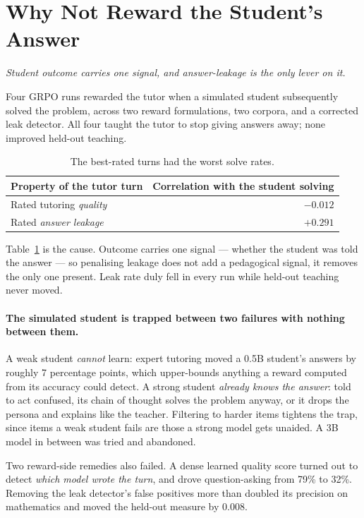 \documentclass[11pt]{article}
\newcommand{\claim}[1]{\vspace{-7pt}\par{\small\itshape #1}\par\vspace{3pt}}
\begin{document}
\section{Why Not Reward the Student's Answer}
\label{sec:why}
\claim{Student outcome carries one signal, and answer-leakage is the only lever on it.}

Four GRPO runs rewarded the tutor when a simulated student subsequently solved the problem, across two
reward formulations, two corpora, and a corrected leak detector. All four taught the tutor to stop
giving answers away; none improved held-out teaching.

\begin{table}[h]
\centering
\begin{tabular}{lr}
\toprule
\textbf{Property of the tutor turn} & \textbf{Correlation with the student solving} \\
\midrule
Rated tutoring \emph{quality} & $-0.012$ \\
Rated \emph{answer leakage}   & $+0.291$ \\
\bottomrule
\end{tabular}
\caption{The best-rated turns had the worst solve rates.}
\label{tab:why}
\end{table}

Table~\ref{tab:why} is the cause. Outcome carries one signal --- whether the student was told the
answer --- so penalising leakage does not add a pedagogical signal, it removes the only one present.
Leak rate duly fell in every run while held-out teaching never moved.

\paragraph{The simulated student is trapped between two failures with nothing between them.} A weak
student \emph{cannot} learn: expert tutoring moved a 0.5B student's answers by roughly 7 percentage
points, which upper-bounds anything a reward computed from its accuracy could detect. A strong student
\emph{already knows the answer}: told to act confused, its chain of thought solves the problem anyway,
or it drops the persona and explains like the teacher. Filtering to harder items tightens the trap,
since items a weak student fails are those a strong model gets unaided. A 3B model in between was tried
and abandoned.

Two reward-side remedies also failed. A dense learned quality score turned out to detect \emph{which
model wrote the turn}, and drove question-asking from 79\% to 32\%. Removing the leak detector's false
positives more than doubled its precision on mathematics and moved the held-out measure by 0.008.
\end{document}
